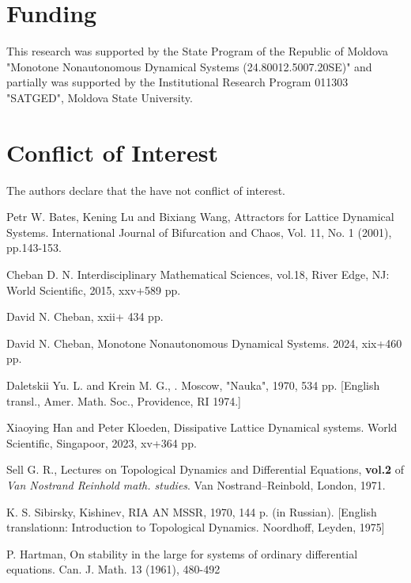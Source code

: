 \documentclass{amsart}%
\begin{document}
\section{Funding}

This research was supported by the State Program of the Republic
of Moldova "Monotone Nonautonomous Dynamical Systems
(24.80012.5007.20SE)" and partially was supported by the
Institutional Research Program 011303 "SATGED", Moldova State
University.

\section{Conflict of Interest}

The authors declare that the have not conflict of interest.




\begin{thebibliography}{100}

 Petr W. Bates, Kening Lu and Bixiang Wang,
\newblock Attractors for Lattice Dynamical Systems.
\newblock International Journal of Bifurcation
and Chaos, Vol. 11, No. 1 (2001), pp.143-153.


 Cheban D. N.
\newblock Interdisciplinary Mathematical Sciences,
vol.18, River Edge, NJ: World Scientific, 2015, xxv+589 pp.


 David N. Cheban,
 xxii+ 434 pp.

 David N. Cheban,
\newblock Monotone Nonautonomous Dynamical Systems.
 2024, xix+460 pp.


Daletskii Yu. L. and Krein M. G.,
.
\newblock Moscow, "Nauka", 1970, 534 pp. [English transl., Amer. Math. Soc., Providence, RI
1974.]

 Xiaoying Han and Peter Kloeden,
\newblock Dissipative Lattice Dynamical systems.
\newblock World Scientific, Singapoor, 2023, xv+364 pp.

Sell G. R.,
\newblock  Lectures on Topological Dynamics and Differential Equations,
{\bf vol.2} of {\it Van Nostrand Reinhold math. studies}.
\newblock Van Nostrand--Reinbold, London, 1971.

K. S. Sibirsky,
\newblock Kishinev, RIA AN MSSR, 1970, 144 p. (in Russian). [English
translationn: Introduction to Topological Dynamics. Noordhoff,
Leyden, 1975]

P. Hartman, On stability in the large for systems of ordinary differential equations.
Can. J. Math. 13 (1961), 480-492

\end{thebibliography}
\end{document}
